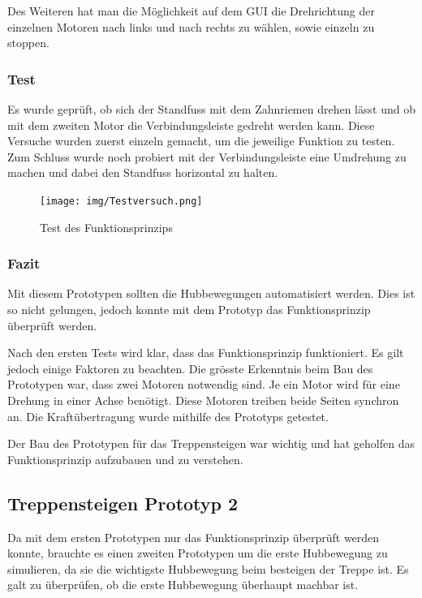 Des Weiteren hat man die Möglichkeit auf dem GUI die Drehrichtung der einzelnen Motoren nach links und nach rechts zu wählen, sowie einzeln zu stoppen.

\subsubsection{Test}

Es wurde geprüft, ob sich der Standfuss mit dem Zahnriemen drehen lässt und ob mit dem zweiten Motor die Verbindungsleiste gedreht werden kann. Diese Versuche wurden zuerst einzeln gemacht, um die jeweilige Funktion zu testen. Zum Schluss wurde noch probiert mit der Verbindungsleiste eine Umdrehung zu machen und dabei den Standfuss horizontal zu halten.

\begin{figure}[H]
  \texttt{[image: img/Testversuch.png]}
  \centering
  \caption{Test des Funktionsprinzips}
\end{figure}

\subsubsection{Fazit}

Mit diesem Prototypen sollten die Hubbewegungen automatisiert werden. Dies ist so nicht gelungen, jedoch konnte mit dem Prototyp das Funktionsprinzip überprüft werden.


Nach den ersten Tests wird klar, dass das Funktionsprinzip funktioniert. Es gilt jedoch einige Faktoren zu beachten. Die grösste Erkenntnis beim Bau des Prototypen war, dass zwei Motoren notwendig sind. Je ein Motor wird für eine Drehung in einer Achse benötigt. Diese Motoren treiben beide Seiten synchron an. Die Kraftübertragung wurde mithilfe des Prototyps getestet.

Der Bau des Prototypen für das Treppensteigen war wichtig und hat geholfen das Funktionsprinzip aufzubauen und zu verstehen.

\newpage

\subsection{Treppensteigen Prototyp 2}

Da mit dem ersten Prototypen nur das Funktionsprinzip überprüft werden konnte, brauchte es einen zweiten Prototypen um die erste Hubbewegung zu simulieren, da sie die wichtigste Hubbewegung beim besteigen der Treppe ist. Es galt zu überprüfen, ob die erste Hubbewegung überhaupt machbar ist.

